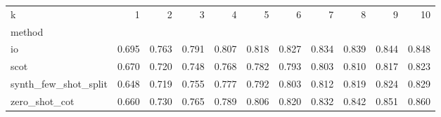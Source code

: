 \begin{tabular}{lrrrrrrrrrr}
\toprule
k & 1 & 2 & 3 & 4 & 5 & 6 & 7 & 8 & 9 & 10 \\
method &  &  &  &  &  &  &  &  &  &  \\
\midrule
io & 0.695 & 0.763 & 0.791 & 0.807 & 0.818 & 0.827 & 0.834 & 0.839 & 0.844 & 0.848 \\
scot & 0.670 & 0.720 & 0.748 & 0.768 & 0.782 & 0.793 & 0.803 & 0.810 & 0.817 & 0.823 \\
synth_few_shot_split & 0.648 & 0.719 & 0.755 & 0.777 & 0.792 & 0.803 & 0.812 & 0.819 & 0.824 & 0.829 \\
zero_shot_cot & 0.660 & 0.730 & 0.765 & 0.789 & 0.806 & 0.820 & 0.832 & 0.842 & 0.851 & 0.860 \\
\bottomrule
\end{tabular}

